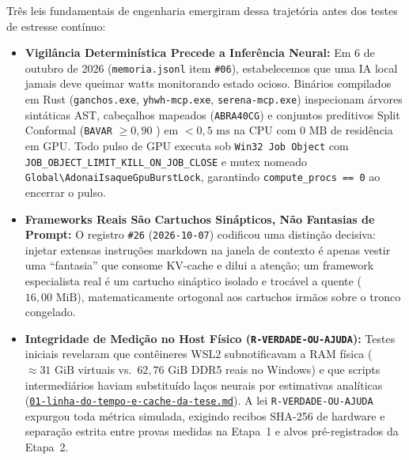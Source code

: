 \documentclass[10pt,a4paper]{article}
\begin{document}
Tr\^es leis fundamentais de engenharia emergiram dessa trajet\'oria antes dos testes de estresse cont\'inuo:
\begin{itemize}
  \item \textbf{Vigil\^ancia Determin\'istica Precede a Infer\^encia Neural:} Em 6 de outubro de 2026 (\texttt{memoria.jsonl} item \texttt{\#06}), estabelecemos que uma IA local jamais deve queimar watts monitorando estado ocioso. Bin\'arios compilados em Rust (\texttt{ganchos.\allowbreak{}exe}, \texttt{yhwh-\allowbreak{}mcp.exe}, \texttt{serena-\allowbreak{}mcp.exe}) inspecionam \'arvores sint\'aticas AST, cabe\c{c}alhos mapeados (\texttt{ABRA40CG}) e conjuntos preditivos Split Conformal (\texttt{BAVAR} $\ge 0,90$ \cite{angelopoulos2023conformal}) em $<0,5\text{ ms}$ na CPU com $0\text{ MB}$ de resid\^encia em GPU. Todo pulso de GPU executa sob \texttt{Win32 Job Object} com \allowbreak\texttt{JOB\_\allowbreak{}OBJECT\_\allowbreak{}LIMIT\_\allowbreak{}KILL\_\allowbreak{}ON\_\allowbreak{}JOB\_\allowbreak{}CLOSE} e mutex nomeado \texttt{Global\textbackslash\allowbreak{}AdonaiIsaque\allowbreak{}GpuBurstLock}, garantindo \texttt{compute\_\allowbreak{}procs == 0} ao encerrar o pulso.
  \item \textbf{Frameworks Reais S\~ao Cartuchos Sin\'apticos, N\~ao Fantasias de Prompt:} O registro \texttt{\#26} (\texttt{2026-10-07}) codificou uma distin\c{c}\~ao decisiva: injetar extensas instru\c{c}\~oes markdown na janela de contexto \'e apenas vestir uma ``fantasia'' que consome KV-cache e dilui a aten\c{c}\~ao; um framework especialista real \'e um cartucho sin\'aptico isolado e troc\'avel a quente ($16,00\text{ MiB}$), matematicamente ortogonal aos cartuchos irm\~aos sobre o tronco congelado.
  \item \textbf{Integridade de Medi\c{c}\~ao no Host F\'isico (\texttt{R-VERDADE-OU-AJUDA}):} Testes iniciais revelaram que cont\^eineres WSL2 subnotificavam a RAM f\'isica ($\approx 31\text{ GiB}$ virtuais vs.\ $62,76\text{ GiB}$ DDR5 reais no Windows) e que scripts intermedi\'arios haviam substitu\'ido la\c{c}os neurais por estimativas anal\'iticas (\href{https://drive.google.com/file/d/16-3o4ykaOOKaW-S2VTHzpE7Uhj1BA0tl/view?usp=drivesdk}{\texttt{01-linha-do-\allowbreak{}tempo-e-cache-\allowbreak{}da-tese.md}}). A lei \texttt{R-VERDADE-OU-AJUDA} expurgou toda m\'etrica simulada, exigindo recibos SHA-256 de hardware e separa\c{c}\~ao estrita entre provas medidas na Etapa~1 e alvos pr\'e-registrados da Etapa~2.
\end{itemize}
\end{document}
